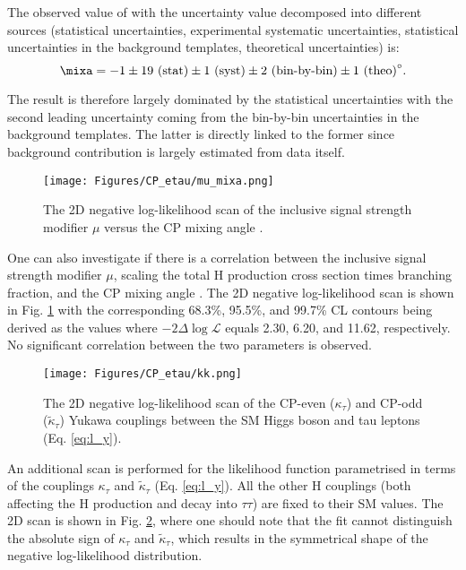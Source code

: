 The observed value of \mixa with the uncertainty value decomposed into different sources (statistical uncertainties, experimental systematic uncertainties, statistical uncertainties in the background templates, theoretical uncertainties) is:
\begin{equation}
    \mixa = -1 \pm 19 ~\text{(stat)} \pm 1 ~\text{(syst)} \pm 2 ~\text{(bin-by-bin)} \pm 1 ~\text{(theo)}^\circ.
\end{equation}

The result is therefore largely dominated by the statistical uncertainties with the second leading uncertainty coming from the bin-by-bin uncertainties in the background templates. The latter is directly linked to the former since background contribution is largely estimated from data itself.

\begin{figure}[h!]
    \centering
    \texttt{[image: Figures/CP\_etau/mu\_mixa.png]}
    \caption{The 2D negative log-likelihood scan of the inclusive signal strength modifier $\mu$ versus the CP mixing angle \mixa.}
    \label{fig:mu_mixa}
\end{figure}

One can also investigate if there is a correlation between the inclusive signal strength modifier $\mu$, scaling the total H production cross section times \htt branching fraction, and the CP mixing angle \mixa. The 2D negative log-likelihood scan is shown in Fig. \ref{fig:mu_mixa} with the corresponding 68.3\%, 95.5\%, and 99.7\% CL contours being derived as the values where $-2\Delta\log\mathcal{L}$ equals 2.30, 6.20, and 11.62, respectively. No significant correlation between the two parameters is observed.

\begin{figure}[h!]
    \centering
    \texttt{[image: Figures/CP\_etau/kk.png]}
    \caption{The 2D negative log-likelihood scan of the CP-even ($\kappa_\tau$) and CP-odd ($\tilde{\kappa}_\tau$) Yukawa couplings between the SM Higgs boson and tau leptons (Eq. \ref{eq:l_y}).}
    \label{fig:kk}
\end{figure}

An additional scan is performed for the likelihood function parametrised in terms of the couplings $\kappa_\tau$ and $\tilde{\kappa}_\tau$ (Eq. \ref{eq:l_y}). All the other H couplings (both affecting the H production and decay into $\tau\tau$) are fixed to their SM values. The 2D scan is shown in Fig. \ref{fig:kk}, where one should note that the fit cannot distinguish the absolute sign of $\kappa_\tau$ and $\tilde{\kappa}_\tau$, which results in the symmetrical shape of the negative log-likelihood distribution.

